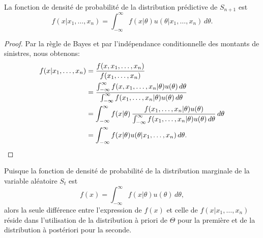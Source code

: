 \begin{thm}
  \label{thm:bayesienne:predictive}
  La fonction de densité de probabilité de la distribution prédictive
  de $S_{n + 1}$ est
  \begin{equation*}
    f(x|x_1, \dots, x_n) = \int_{-\infty}^\infty f(x|\theta)
    u(\theta|x_1, \dots, x_n)\, d\theta.
  \end{equation*}
\end{thm}
\begin{proof}
  Par la règle de Bayes et par l'indépendance conditionnelle des
  montants de sinistres, nous obtenons:
  \begin{align*}
    f(x|x_1, \dots, x_n)
    &= \frac{f(x, x_1, \dots, x_n)}{f(x_1, \dots, x_n)} \\
    &= \frac{%
      \int_{-\infty}^\infty f(x, x_1, \dots, x_n|\theta) u(\theta)\,
      d\theta}{%
      \int_{-\infty}^\infty f(x_1, \dots, x_n|\theta)
      u(\theta)\, d\theta} \\
    &= \int_{-\infty}^\infty f(x|\theta)\, \frac{f(x_1, \dots,
      x_n|\theta) u(\theta)}{%
      \int_{-\infty}^\infty f(x_1, \dots, x_n|\theta)
      u(\theta)\, d\theta}\, d\theta \\
    &= \int_{-\infty}^\infty f(x|\theta) u(\theta|x_1, \dots, x_n)\,
    d\theta.
  \end{align*}
\end{proof}

Puisque la fonction de densité de probabilité de la distribution
marginale de la variable aléatoire $S_t$ est
\begin{equation*}
  f(x) = \int_{-\infty}^\infty f(x|\theta) u(\theta)\, d\theta,
\end{equation*}
alors la seule différence entre l'expression de $f(x)$ et celle de
$f(x|x_1, \dots, x_n)$ réside dans l'utilisation de la distribution à
priori de $\Theta$ pour la première et de la distribution à postériori
pour la seconde.


